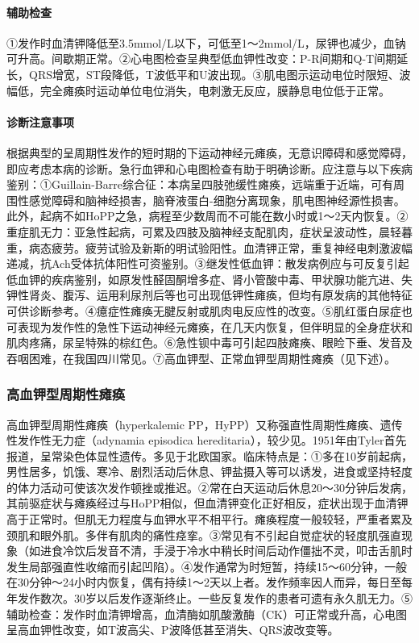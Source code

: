\paragraph{辅助检查}

①发作时血清钾降低至3.5mmol/L以下，可低至1～2mmol/L，尿钾也减少，血钠可升高。间歇期正常。②心电图检查呈典型低血钾性改变：P-R间期和Q-T间期延长，QRS增宽，ST段降低，T波低平和U波出现。③肌电图示运动电位时限短、波幅低，完全瘫痪时运动单位电位消失，电刺激无反应，膜静息电位低于正常。

\paragraph{诊断注意事项}

根据典型的呈周期性发作的短时期的下运动神经元瘫痪，无意识障碍和感觉障碍，即应考虑本病的诊断。急行血钾和心电图检查有助于明确诊断。应注意与以下疾病鉴别：①Guillain-Barre综合征：本病呈四肢弛缓性瘫痪，远端重于近端，可有周围性感觉障碍和脑神经损害，脑脊液蛋白-细胞分离现象，肌电图神经源性损害。此外，起病不如HoPP之急，病程至少数周而不可能在数小时或1～2天内恢复。②重症肌无力：亚急性起病，可累及四肢及脑神经支配肌肉，症状呈波动性，晨轻暮重，病态疲劳。疲劳试验及新斯的明试验阳性。血清钾正常，重复神经电刺激波幅递减，抗Ach受体抗体阳性可资鉴别。③继发性低血钾：散发病例应与可反复引起低血钾的疾病鉴别，如原发性醛固酮增多症、肾小管酸中毒、甲状腺功能亢进、失钾性肾炎、腹泻、运用利尿剂后等也可出现低钾性瘫痪，但均有原发病的其他特征可供诊断参考。④癔症性瘫痪无腱反射或肌肉电反应性的改变。⑤肌红蛋白尿症也可表现为发作性的急性下运动神经元瘫痪，在几天内恢复，但伴明显的全身症状和肌肉疼痛，尿呈特殊的棕红色。⑥急性钡中毒可引起四肢瘫痪、眼睑下垂、发音及吞咽困难，在我国四川常见。⑦高血钾型、正常血钾型周期性瘫痪（见下述）。

\subsubsection{高血钾型周期性瘫痪}

高血钾型周期性瘫痪（hyperkalemic
PP，HyPP）又称强直性周期性瘫痪、遗传性发作性无力症（adynamia episodica
hereditaria），较少见。1951年由Tyler首先报道，呈常染色体显性遗传。多见于北欧国家。临床特点是：①多在10岁前起病，男性居多，饥饿、寒冷、剧烈活动后休息、钾盐摄入等可以诱发，进食或坚持轻度的体力活动可使该次发作顿挫或推迟。②常在白天运动后休息20～30分钟后发病，其前驱症状与瘫痪经过与HoPP相似，但血清钾变化正好相反，症状出现于血清钾高于正常时。但肌无力程度与血钾水平不相平行。瘫痪程度一般较轻，严重者累及颈肌和眼外肌。多伴有肌肉的痛性痉挛。③常见有不引起自觉症状的轻度肌强直现象（如进食冷饮后发音不清，手浸于冷水中稍长时间后动作僵拙不灵，叩击舌肌时发生局部强直性收缩而引起凹陷）。④发作通常为时短暂，持续15～60分钟，一般在30分钟～24小时内恢复，偶有持续1～2天以上者。发作频率因人而异，每日至每年发作数次。30岁以后发作逐渐终止。一些反复发作的患者可遗有永久肌无力。⑤辅助检查：发作时血清钾增高，血清酶如肌酸激酶（CK）可正常或升高，心电图呈高血钾性改变，如T波高尖、P波降低甚至消失、QRS波改变等。

